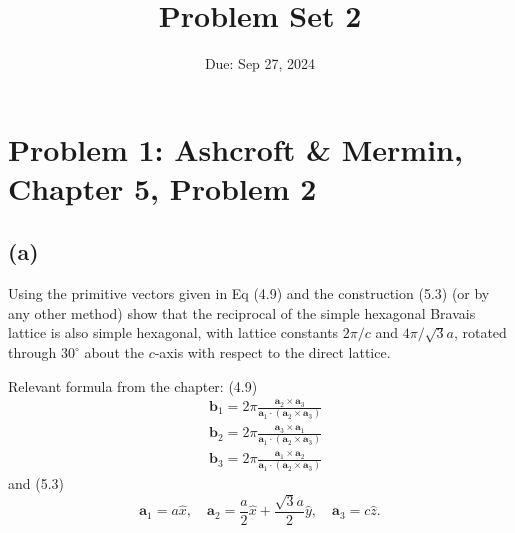\documentclass[12pt]{article}
\title{Problem Set 2}
\author{}
\date{Due: Sep 27, 2024}
\begin{document}
\maketitle

\section*{Problem 1: Ashcroft \& Mermin, Chapter 5, Problem 2}
\subsection{(a)}
 Using the primitive vectors given in Eq (4.9) and the construction (5.3) (or by any other method) show that the reciprocal of the simple hexagonal Bravais lattice is also simple hexagonal, with lattice constants $2 \pi / c$ and $4 \pi / \sqrt{3} a$, rotated through $30^{\circ}$ about the $c$-axis with respect to the direct lattice.

Relevant formula from the chapter:
(4.9)
$$
\begin{aligned}
& \mathbf{b}_1=2 \pi \frac{\mathbf{a}_2 \times \mathbf{a}_3}{\mathbf{a}_1 \cdot\left(\mathbf{a}_2 \times \mathbf{a}_3\right)} \\
& \mathbf{b}_2=2 \pi \frac{\mathbf{a}_3 \times \mathbf{a}_1}{\mathbf{a}_1 \cdot\left(\mathbf{a}_2 \times \mathbf{a}_3\right)} \\
& \mathbf{b}_3=2 \pi \frac{\mathbf{a}_1 \times \mathbf{a}_2}{\mathbf{a}_1 \cdot\left(\mathbf{a}_2 \times \mathbf{a}_3\right)}
\end{aligned}
$$
and (5.3)
$$
\mathbf{a}_1=a \hat{x}, \quad \mathbf{a}_2=\frac{a}{2} \hat{x}+\frac{\sqrt{3} a}{2} \hat{y}, \quad \mathbf{a}_3=c \hat{z} .
$$
\end{document}
